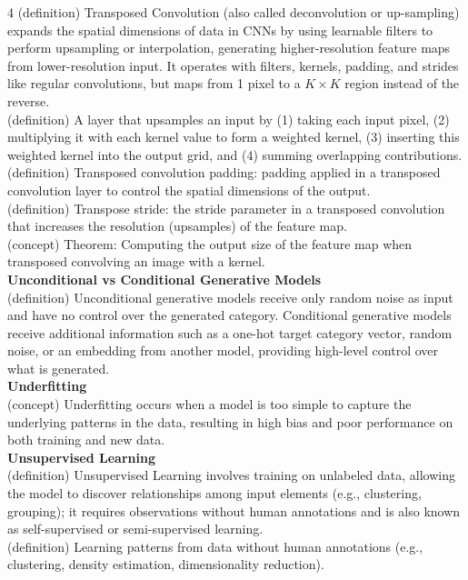\documentclass[8pt]{extarticle}
\begin{document}
\begin{multicols}{4}
(definition) Transposed Convolution (also called deconvolution or up-sampling) expands the spatial dimensions of data in CNNs by using learnable filters to perform upsampling or interpolation, generating higher-resolution feature maps from lower-resolution input. It operates with filters, kernels, padding, and strides like regular convolutions, but maps from 1 pixel to a $K\times K$ region instead of the reverse.\\
(definition) A layer that upsamples an input by (1) taking each input pixel, (2) multiplying it with each kernel value to form a weighted kernel, (3) inserting this weighted kernel into the output grid, and (4) summing overlapping contributions.\\
(definition) Transposed convolution padding: padding applied in a transposed convolution layer to control the spatial dimensions of the output.\\
(definition) Transpose stride: the stride parameter in a transposed convolution that increases the resolution (upsamples) of the feature map.\\
(concept) Theorem: Computing the output size of the feature map when transposed convolving an image with a kernel.\\
\vspace{2pt}\textbf{Unconditional vs Conditional Generative Models}\\
(definition) Unconditional generative models receive only random noise as input and have no control over the generated category. Conditional generative models receive additional information such as a one-hot target category vector, random noise, or an embedding from another model, providing high-level control over what is generated.\\
\vspace{2pt}\textbf{Underfitting}\\
(concept) Underfitting occurs when a model is too simple to capture the underlying patterns in the data, resulting in high bias and poor performance on both training and new data.\\
\vspace{2pt}\textbf{Unsupervised Learning}\\
(definition) Unsupervised Learning involves training on unlabeled data, allowing the model to discover relationships among input elements (e.g., clustering, grouping); it requires observations without human annotations and is also known as self-supervised or semi-supervised learning.\\
(definition) Learning patterns from data without human annotations (e.g., clustering, density estimation, dimensionality reduction).\\

\end{multicols}
\end{document}
